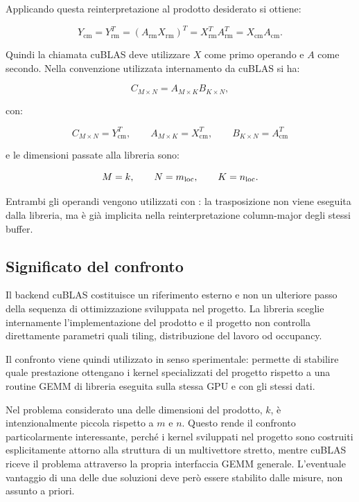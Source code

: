Applicando questa reinterpretazione al prodotto desiderato si ottiene:

\[
Y_{\mathrm{cm}}
=
Y_{\mathrm{rm}}^{T}
=
\left(A_{\mathrm{rm}}X_{\mathrm{rm}}\right)^{T}
=
X_{\mathrm{rm}}^{T}A_{\mathrm{rm}}^{T}
=
X_{\mathrm{cm}}A_{\mathrm{cm}}.
\]

Quindi la chiamata cuBLAS deve utilizzare $X$ come primo operando e $A$ come
secondo. Nella convenzione utilizzata internamento da cuBLAS si ha:

\[
C_{M\times N}=A_{M\times K}B_{K\times N},
\]

con:

\[
C_{M\times N}=Y_{\mathrm{cm}}^{T},
\qquad
A_{M\times K}=X_{\mathrm{cm}}^{T},
\qquad
B_{K\times N}=A_{\mathrm{cm}}^{T}
\]

e le dimensioni passate alla libreria sono:

\[
M=k,\qquad N=m_{\text{loc}},\qquad K=n_{\text{loc}}.
\]

Entrambi gli operandi vengono utilizzati con
: la trasposizione non viene eseguita dalla libreria,
ma è già implicita nella reinterpretazione column-major degli stessi buffer.

\subsection{Significato del confronto}

Il backend cuBLAS costituisce un riferimento esterno e non un ulteriore
passo della sequenza di ottimizzazione sviluppata nel progetto. La libreria
sceglie internamente l'implementazione del prodotto e il progetto non
controlla direttamente parametri quali tiling, distribuzione del lavoro od
occupancy.

Il confronto viene quindi utilizzato in senso sperimentale: permette di
stabilire quale prestazione ottengano i kernel specializzati del progetto
rispetto a una routine GEMM di libreria eseguita sulla stessa GPU e con gli
stessi dati.

Nel problema considerato una delle dimensioni del prodotto, $k$, è
intenzionalmente piccola rispetto a $m$ e $n$. Questo rende il confronto
particolarmente interessante, perché i kernel sviluppati nel progetto
sono costruiti esplicitamente attorno alla struttura di un multivettore
stretto, mentre cuBLAS riceve il problema attraverso la propria interfaccia
GEMM generale. L'eventuale vantaggio di una delle due soluzioni deve però
essere stabilito dalle misure, non assunto a priori.


